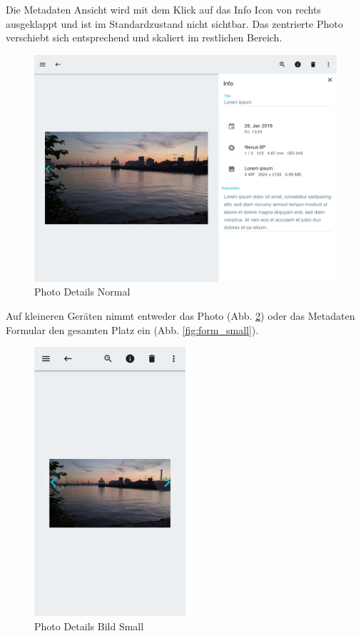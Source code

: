 Die Metadaten Ansicht wird mit dem Klick auf das Info Icon von rechts ausgeklappt und ist im Standardzustand nicht sichtbar. Das zentrierte Photo verschiebt sich entsprechend und skaliert im restlichen Bereich.

\begin{figure}[htp]     %
\centering
\includegraphics[width=1.0\textwidth]{images/form_normal} 
\caption{Photo Details Normal}\label{fig:form_normal}
\end{figure}

Auf kleineren Geräten nimmt entweder das Photo (Abb. \ref{fig:details_small}) oder das Metadaten Formular den gesamten Platz ein (Abb. \ref{fig:form_small}). 

\begin{figure}[htp]     %
\centering
\includegraphics[width=0.5\textwidth]{images/details_small} 
\caption{Photo Details Bild Small}\label{fig:details_small}
\end{figure}

